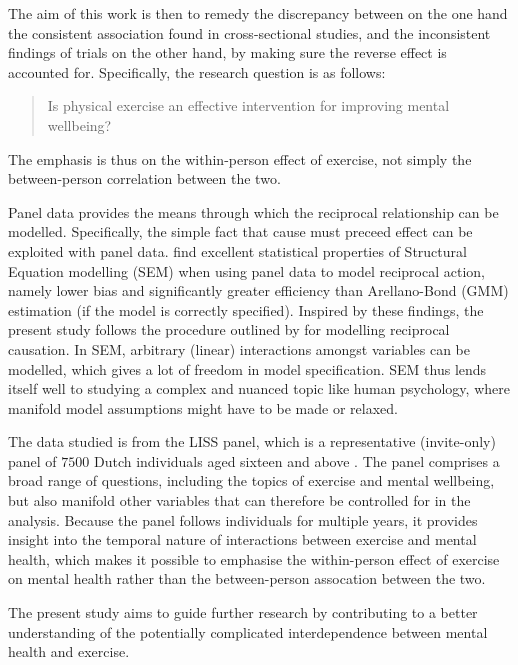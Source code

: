 The aim of this work is then to remedy the discrepancy between on the one hand the consistent association found in
cross-sectional studies, and the inconsistent findings of trials on the other hand, by making sure the reverse effect
is accounted for.
Specifically, the research question is as follows:
\begin{quote}
    Is physical exercise an effective intervention for improving mental wellbeing?
\end{quote}
The emphasis is thus on the within-person effect of exercise, not simply the between-person correlation between the two.

Panel data provides the means through which the reciprocal relationship can be modelled. Specifically, the simple fact
that cause must preceed effect can be exploited with panel data.
 find excellent statistical properties of Structural Equation modelling (SEM)
when using panel data to model reciprocal action, namely lower bias and significantly greater efficiency than Arellano-Bond
(GMM) estimation (if the model is correctly specified).
Inspired by these findings, the present study follows the procedure outlined by 
for modelling reciprocal causation.
In SEM, arbitrary (linear) interactions amongst variables can be modelled, which gives a lot of freedom in model
specification. SEM thus lends itself well to studying a complex and nuanced topic like human psychology,
where manifold model assumptions might have to be made or relaxed.

The data studied is from the LISS panel, which is a representative (invite-only) panel of $7500$ Dutch individuals aged
sixteen and above \cite{scherpenzeel2010liss}. The panel comprises a broad range of questions, including the topics of exercise
and mental wellbeing, but also manifold other variables that can therefore be controlled for in the analysis.
Because the panel follows individuals for multiple years, it provides insight into the temporal nature of interactions
between exercise and mental health, which makes it possible to emphasise the within-person effect of exercise on mental health
rather than the between-person assocation between the two.

The present study aims to guide further research by contributing to a better understanding of the potentially
complicated interdependence between mental health and exercise.
